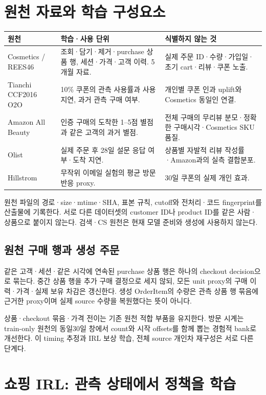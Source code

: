 \documentclass[11pt,a4paper]{article}
\newcommand{\page}{\clearpage}
\newcommand{\thead}{\rowcolor{pale}}
\begin{document}
\page
\section{원천 자료와 학습 구성요소}
\begin{tabularx}{\linewidth}{@{}P{.21\linewidth}P{.34\linewidth}Y@{}}\thead 원천 & 학습·사용 단위 & 식별하지 않는 것\\\midrule
Cosmetics / REES46 & 조회·담기·제거·purchase 상품 행, 세션·가격·고객 이력. 5개월 자료. & 실제 주문 ID·수량·가입일·초기 cart·리뷰·쿠폰 노출.\\[5pt]
Tianchi CCF2016 O2O & 10\% 쿠폰의 관측 사용률과 사용 지연, 과거 관측 구매 여부. & 개인별 쿠폰 인과 uplift와 Cosmetics 동일인 연결.\\[5pt]
Amazon All Beauty & 인증 구매의 도착한 1--5점 별점과 같은 고객의 과거 별점. & 전체 구매의 무리뷰 분모·정확한 구매시각·Cosmetics SKU 품질.\\[5pt]
Olist & 실제 주문 후 28일 설문 응답 여부·도착 지연. & 상품별 자발적 리뷰 작성률·Amazon과의 실측 결합분포.\\[5pt]
Hillstrom & 무작위 이메일 실험의 평균 방문 반응 proxy. & 30일 쿠폰의 실제 개인 효과.\\\bottomrule\end{tabularx}

원천 파일의 경로·size·mtime·SHA, 표본 규칙, cutoff와 전처리·코드 fingerprint를 산출물에 기록한다. 서로 다른 데이터셋의 customer ID나 product ID를 같은 사람·상품으로 붙이지 않는다. 검색·CS 원천은 현재 모델 준비와 생성에 사용하지 않는다.

\subsection{원천 구매 행과 생성 주문}
같은 고객·세션·같은 시각에 연속된 purchase 상품 행은 하나의 checkout decision으로 묶는다. 중간 상품 행을 추가 구매 결정으로 세지 않되, 모든 unit proxy의 구매 이력·가격·실제 보유 차감은 갱신한다. 생성 OrderItem의 수량은 관측 상품 행 묶음에 근거한 proxy이며 실제 source 수량을 복원했다는 뜻이 아니다.

상품·checkout 묶음·가격 전이는 기존 원천 적합 부품을 유지한다. 방문 시계는 train-only 원천의 동일30일 창에서 count와 시작 offsets를 함께 뽑는 경험적 bank로 개선한다. 이 timing 추정과 IRL 보상 학습, 전체 source 개인차 재구성은 서로 다른 단계다.

\page
\section{쇼핑 IRL: 관측 상태에서 정책을 학습}
\end{document}
